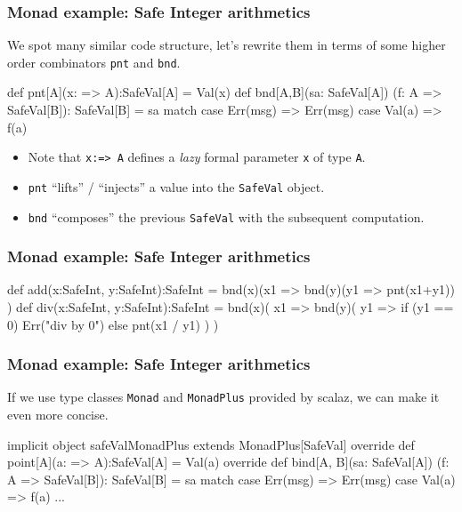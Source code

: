 \documentclass{beamer}
\newcommand{\beb}{\begin{exampleblock}}
\newcommand{\eeb}{\end{exampleblock}}
\begin{document}
\begin{frame}[fragile]
\frametitle{Monad example: Safe Integer arithmetics}
We spot many similar code structure, let's rewrite them in terms of
some higher order combinators {\tt pnt} and {\tt bnd}.
\beb{}
\begin{code}
def pnt[A](x: => A):SafeVal[A] = Val(x)
def bnd[A,B](sa: SafeVal[A])
  (f: A => SafeVal[B]): SafeVal[B] = sa match {
  case Err(msg) => Err(msg)
  case Val(a)   => f(a)
}
\end{code}
\eeb{}
\begin{itemize}
\item Note that {\tt x:=> A} defines a {\em lazy} formal parameter {\tt x}
of type {\tt A}.
\item {\tt pnt} ``lifts'' / ``injects'' a value into the {\tt SafeVal}
  object.
\item {\tt bnd} ``composes'' the previous {\tt SafeVal} with the
  subsequent computation.
\end{itemize}
\end{frame}
\begin{frame}[fragile]
\frametitle{Monad example: Safe Integer arithmetics}
\beb{}
\begin{code}
def add(x:SafeInt, y:SafeInt):SafeInt = {
  bnd(x)(x1 => { 
    bnd(y)(y1 => pnt(x1+y1))
  })
}
def div(x:SafeInt, y:SafeInt):SafeInt = {
  bnd(x)( x1 => {
    bnd(y)( y1 => {
      if (y1 == 0) { Err("div by 0") }
      else { pnt(x1 / y1) }
    })
  })
}
\end{code}
\eeb{}
\end{frame}

\begin{frame}[fragile]
\frametitle{Monad example: Safe Integer arithmetics}
If we use type classes {\tt Monad} and {\tt MonadPlus} provided by
scalaz, we can make it even more concise. 
\beb{}
\begin{code}
implicit object safeValMonadPlus 
  extends MonadPlus[SafeVal] {
  override def point[A](a: => A):SafeVal[A] = Val(a)
  override def bind[A, B](sa: SafeVal[A])
  (f: A => SafeVal[B]): SafeVal[B] = sa match {
    case Err(msg) => Err(msg)
    case Val(a)   => f(a)
  } 
 ... 
}
\end{code}
\eeb{}
\end{frame}
\end{document}
